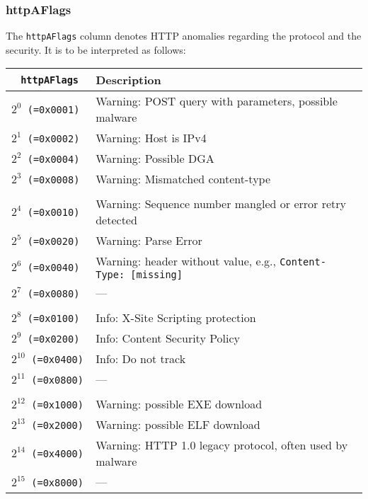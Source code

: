 \documentclass[documentation]{subfiles}
\begin{document}
\subsubsection{httpAFlags}\label{httpAFlags}
The {\tt httpAFlags} column denotes HTTP anomalies regarding the protocol and the security.
It is to be interpreted as follows:
\begin{longtable}{>{\tt}rl}
    \toprule
    {\bf httpAFlags}   & {\bf Description}\\
    \midrule\endhead%
    $2^{0}$  (=0x0001) & Warning: POST query with parameters, possible malware \\
    $2^{1}$  (=0x0002) & Warning: Host is IPv4\\
    $2^{2}$  (=0x0004) & Warning: Possible DGA\\
    $2^{3}$  (=0x0008) & Warning: Mismatched content-type\\
    \\
    $2^{4}$  (=0x0010) & Warning: Sequence number mangled or error retry detected\\
    $2^{5}$  (=0x0020) & Warning: Parse Error\\
    $2^{6}$  (=0x0040) & Warning: header without value, e.g., {\tt Content-Type:\ [missing]}\\
    $2^{7}$  (=0x0080) & ---\\
    \\
    $2^{8}$  (=0x0100) & Info: X-Site Scripting protection\\
    $2^{9}$  (=0x0200) & Info: Content Security Policy\\
    $2^{10}$ (=0x0400) & Info: Do not track\\
    $2^{11}$ (=0x0800) & ---\\
    \\
    $2^{12}$ (=0x1000) & Warning: possible EXE download\\
    $2^{13}$ (=0x2000) & Warning: possible ELF download\\
    $2^{14}$ (=0x4000) & Warning: HTTP 1.0 legacy protocol, often used by malware\\
    $2^{15}$ (=0x8000) & ---\\
    \bottomrule
\end{longtable}
\end{document}
